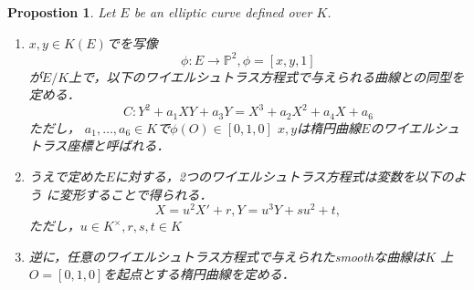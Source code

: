 \documentclass{ujarticle}
\newtheorem{prop}[thm]{Propostion}
\begin{document}
\begin{prop}
 Let $ E $ be an elliptic curve defined over $K$.
 \begin{enumerate}
  \item $ x,y \in K(E) $でを写像
    \begin{equation*}
      \phi : E \to \mathbb{P}^2, \phi=[x,y,1]
    \end{equation*}
    が$E/K$上で，以下のワイエルシュトラス方程式で与えられる曲線との同型を定める．
    \begin{equation*}
      C: Y^2 + a_1XY + a_3Y = X^3 + a_2 X^2 + a_4X +a_6
    \end{equation*}
    ただし， $a_1,\dots,a_6 \in K$で$ \phi(O) \in [0,1,0]$
    $x,y$は楕円曲線$E$のワイエルシュトラス座標と呼ばれる．
  \item うえで定めた$E$に対する，2つのワイエルシュトラス方程式は変数を以下のよう
  に変形することで得られる．
    \begin{equation*}
      X = u^2 X' + r, Y = u^3Y + su^2 + t,
    \end{equation*}
    ただし，$u \in K^{\times} ,r,s,t \in K $
  \item 逆に，任意のワイエルシュトラス方程式で与えられたsmoothな曲線は$K$
  上$O=[0,1,0]$を起点とする楕円曲線を定める．
 \end{enumerate}
\end{prop}
\end{document}
